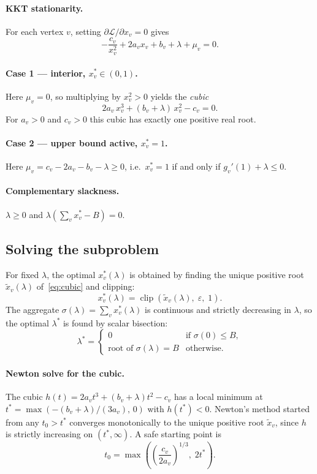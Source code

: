 \documentclass{article}
\newcommand{\clip}{\operatorname{clip}}
\begin{document}
\paragraph{KKT stationarity.}
For each vertex $v$, setting $\partial\mathcal{L}/\partial x_v = 0$ gives
\[
  -\frac{c_v}{x_v^2} + 2a_v x_v + b_v + \lambda + \mu_v = 0.
\]

\paragraph{Case 1 — interior, $x_v^* \in (0,1)$.}
Here $\mu_v = 0$, so multiplying by $x_v^2 > 0$ yields the \emph{cubic}
\begin{equation}
  2a_v\, x_v^3 + (b_v + \lambda)\,x_v^2 - c_v = 0.
  \label{eq:cubic}
\end{equation}
For $a_v > 0$ and $c_v > 0$ this cubic has exactly one positive real root.

\paragraph{Case 2 — upper bound active, $x_v^* = 1$.}
Here $\mu_v = c_v - 2a_v - b_v - \lambda \geq 0$, i.e.\
$x_v^* = 1$ if and only if $g_v'(1) + \lambda \leq 0$.

\paragraph{Complementary slackness.}
$\lambda \geq 0$ and $\lambda\!\left(\sum_v x_v^* - B\right) = 0$.

\subsection*{Solving the subproblem}

For fixed $\lambda$, the optimal $x_v^*(\lambda)$ is obtained by finding
the unique positive root $\tilde x_v(\lambda)$ of~\eqref{eq:cubic} and
clipping:
\[
  x_v^*(\lambda) = \clip\!\left(\tilde x_v(\lambda),\; \varepsilon,\; 1\right).
\]
The aggregate $\sigma(\lambda) = \sum_v x_v^*(\lambda)$ is continuous and
strictly decreasing in $\lambda$, so the optimal $\lambda^*$ is found by
scalar bisection:
\[
  \lambda^* = \begin{cases}
    0 & \text{if } \sigma(0) \leq B, \\
    \text{root of } \sigma(\lambda) = B & \text{otherwise.}
  \end{cases}
\]

\paragraph{Newton solve for the cubic.}
The cubic $h(t) = 2a_v t^3 + (b_v+\lambda)t^2 - c_v$ has a local minimum at
$t^* = \max\!\left(-({b_v+\lambda})/({3a_v}),\,0\right)$ with $h(t^*) < 0$.
Newton's method started from any $t_0 > t^*$ converges monotonically to the
unique positive root $\tilde x_v$, since $h$ is strictly increasing on
$(t^*, \infty)$.  A safe starting point is
\[
  t_0 = \max\!\left(\left(\frac{c_v}{2a_v}\right)^{1/3},\; 2t^*\right).
\]
\end{document}

